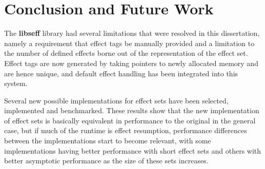 \documentclass[logo,bsc,singlespacing,parskip,online]{infthesis}
\begin{document}

\chapter{Conclusion and Future Work} \label{conc}


The \textbf{libseff} library had several limitations that were resolved in this dissertation, namely a requirement that effect tags be manually provided and a limitation to the number of defined effects borne out of the representation of the effect set. Effect tags are now generated by taking pointers to newly allocated memory and are hence unique, and default effect handling has been integrated into this system. 

Several new possible implementations for effect sets have been selected, implemented and benchmarked. These results show that the new implementation of effect sets is basically equivalent in performance to the original in the general case, but if much of the runtime is effect resumption, performance differences between the implementations start to become relevant, with some implementations having better performance with short effect sets and others with better asymptotic performance as the size of these sets increases.
\end{document}
